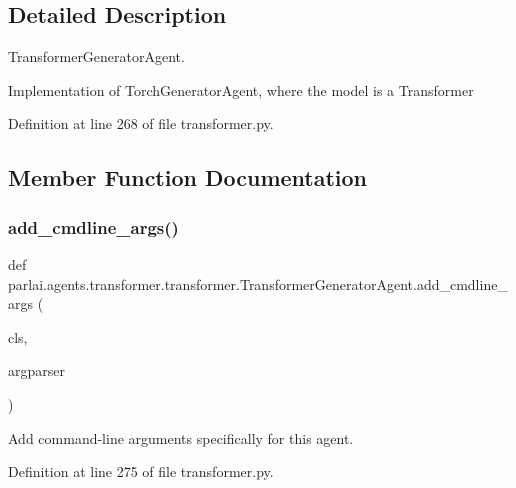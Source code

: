 \subsection{Detailed Description}
\begin{DoxyVerb}TransformerGeneratorAgent.

Implementation of TorchGeneratorAgent, where the model is a Transformer
\end{DoxyVerb}
 

Definition at line 268 of file transformer.\+py.



\subsection{Member Function Documentation}
\mbox{\label{classparlai_1_1agents_1_1transformer_1_1transformer_1_1TransformerGeneratorAgent_a496b5ccc5efe17f290c37dc094ff74e8}} 
\subsubsection{\texorpdfstring{add\+\_\+cmdline\+\_\+args()}{add\_cmdline\_args()}}
{\footnotesize\ttfamily def parlai.\+agents.\+transformer.\+transformer.\+Transformer\+Generator\+Agent.\+add\+\_\+cmdline\+\_\+args (\begin{DoxyParamCaption}\item[{}]{cls,  }\item[{}]{argparser }\end{DoxyParamCaption})}

\begin{DoxyVerb}Add command-line arguments specifically for this agent.\end{DoxyVerb}
 

Definition at line 275 of file transformer.\+py.



